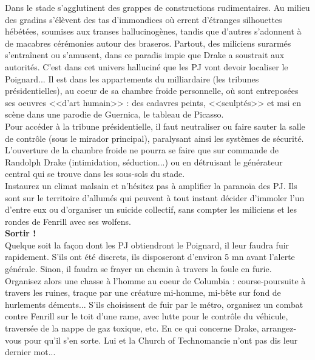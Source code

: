 \documentclass[11pt,twoside,a4paper]{book}
\begin{document}
Dans le stade s'agglutinent des grappes de constructions rudimentaires. Au milieu des gradins s'{\'e}l{\`e}vent des tas d'immondices o{\`u} errent d'{\'e}tranges silhouettes h{\'e}b{\'e}t{\'e}es, soumises aux transes hallucinog{\`e}nes, tandis que d'autres s'adonnent {\`a} de macabres c{\'e}r{\'e}monies autour des braseros. Partout, des miliciens surarm{\'e}s s'entra{\^i}nent ou s'amusent, dans ce paradis impie que Drake a soustrait aux autorit{\'e}s. C'est dans cet univers hallucin{\'e} que les PJ vont devoir localiser le Poignard... Il est dans les appartements du milliardaire (les tribunes pr{\'e}sidentielles), au coeur de sa chambre froide personnelle, o{\`u} sont entrepos{\'e}es ses oeuvres <<d'art humain>> : des cadavres peints, <<sculpt{\'e}s>> et msi en sc{\`e}ne dans une parodie de Guernica, le tableau de Picasso.~\\

Pour acc{\'e}der {\`a} la tribune pr{\'e}sidentielle, il faut neutraliser ou faire sauter la salle de contr{\^o}le (sous le mirador principal), paralysant ainsi les syst{\`e}mes de s{\'e}curit{\'e}. L'ouverture de la chambre froide ne pourra se faire que sur commande de Randolph Drake (intimidation, s{\'e}duction...) ou en d{\'e}truisant le g{\'e}n{\'e}rateur central qui se trouve dans les sous-sols du stade.~\\

Instaurez un climat malsain et n'h{\'e}sitez pas {\`a} amplifier la parano{\"i}a des PJ. Ils sont sur le territoire d'allum{\'e}s qui peuvent {\`a} tout instant d{\'e}cider d'immoler l'un d'entre eux ou d'organiser un suicide collectif, sans compter les miliciens et les rondes de Fenrill avec ses wolfens.~\\

\textbf{Sortir !}~\\

Quelque soit la fa\c{c}on dont les PJ obtiendront le Poignard, il leur faudra fuir rapidement. S'ils ont {\'e}t{\'e} discrets, ils disposeront d'environ 5 mn avant l'alerte g{\'e}n{\'e}rale. Sinon, il faudra se frayer un chemin {\`a} travers la foule en furie. Organisez alors une chasse {\`a} l'homme au coeur de Columbia : course-poursuite {\`a} travers les ruines, traque par une cr{\'e}ature mi-homme, mi-b{\^e}te sur fond de hurlements d{\'e}ments... S'ils choisissent de fuir par le m{\'e}tro, organisez un combat contre Fenrill sur le toit d'une rame, avec lutte pour le contr{\^o}le du v{\'e}hicule, travers{\'e}e de la nappe de gaz toxique, etc. En ce qui concerne Drake, arrangez-vous pour qu'il s'en sorte. Lui et la Church of Technomancie n'ont pas dis leur dernier mot...~\\
\end{document}
